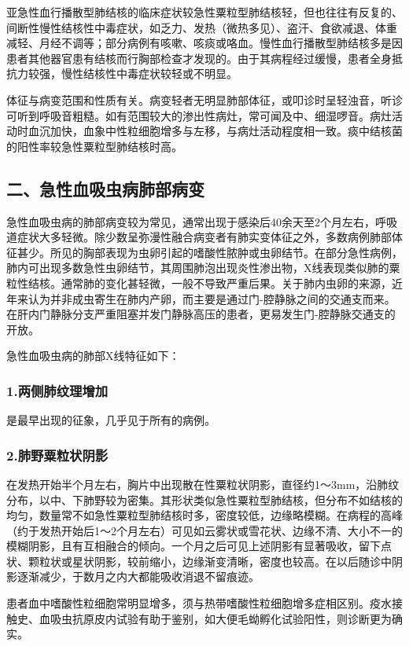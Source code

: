 亚急性血行播散型肺结核的临床症状较急性粟粒型肺结核轻，但也往往有反复的、间断性慢性结核性中毒症状，如乏力、发热（微热多见）、盗汗、食欲减退、体重减轻、月经不调等；部分病例有咳嗽、咳痰或咯血。慢性血行播散型肺结核多是因患者其他器官患有结核而行胸部检查才发现的。由于其病程经过缓慢，患者全身抵抗力较强，慢性结核性中毒症状较轻或不明显。

体征与病变范围和性质有关。病变轻者无明显肺部体征，或叩诊时呈轻浊音，听诊可听到呼吸音粗糙。如有范围较大的渗出性病灶，常可闻及中、细湿啰音。病灶活动时血沉加快，血象中性粒细胞增多与左移，与病灶活动程度相一致。痰中结核菌的阳性率较急性粟粒型肺结核时高。

\subsection{二、急性血吸虫病肺部病变}

急性血吸虫病的肺部病变较为常见，通常出现于感染后40余天至2个月左右，呼吸道症状大多轻微。除少数呈弥漫性融合病变者有肺实变体征之外，多数病例肺部体征甚少。所见的胸部表现为虫卵引起的嗜酸性脓肿或虫卵结节。在部分急性病例，肺内可出现多数急性虫卵结节，其周围肺泡出现炎性渗出物，X线表现类似肺的粟粒性结核。通常肺的变化甚轻微，一般不导致严重后果。关于肺内虫卵的来源，近年来认为并非成虫寄生在肺内产卵，而主要是通过门-腔静脉之间的交通支而来。在肝内门静脉分支严重阻塞并发门静脉高压的患者，更易发生门-腔静脉交通支的开放。

急性血吸虫病的肺部X线特征如下：

\subsubsection{1.两侧肺纹理增加}

是最早出现的征象，几乎见于所有的病例。

\subsubsection{2.肺野粟粒状阴影}

在发热开始半个月左右，胸片中出现散在性粟粒状阴影，直径约1～3mm，沿肺纹分布，以中、下肺野较为密集。其形状类似急性粟粒型肺结核，但分布不如结核的均匀，数量常不如急性粟粒型肺结核时多，密度较低，边缘略模糊。在病程的高峰（约于发热开始后1～2个月左右）可见如云雾状或雪花状、边缘不清、大小不一的模糊阴影，且有互相融合的倾向。一个月之后可见上述阴影有显著吸收，留下点状、颗粒状或星状阴影，较前缩小，边缘渐变清晰，密度也较高。在以后随诊中阴影逐渐减少，于数月之内大都能吸收消退不留痕迹。

患者血中嗜酸性粒细胞常明显增多，须与热带嗜酸性粒细胞增多症相区别。疫水接触史、血吸虫抗原皮内试验有助于鉴别，如大便毛蚴孵化试验阳性，则诊断更为确实。

